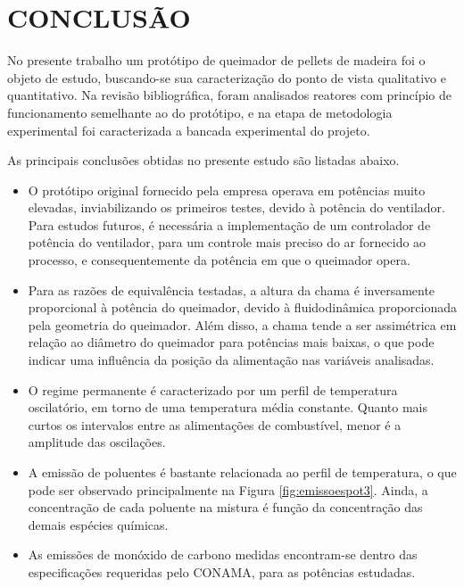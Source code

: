 






\chapter*{CONCLUSÃO}

No presente trabalho um protótipo de queimador de pellets de madeira foi o objeto de estudo, buscando-se sua caracterização do ponto de vista qualitativo e quantitativo. Na revisão bibliográfica, foram analisados reatores com princípio de funcionamento semelhante ao do protótipo, e na etapa de metodologia experimental foi caracterizada a bancada experimental do projeto.

As principais conclusões obtidas no presente estudo são listadas abaixo.

\begin{itemize}
    \item O protótipo original fornecido pela empresa operava em potências muito elevadas, inviabilizando os primeiros testes, devido à potência do ventilador. Para estudos futuros, é necessária a implementação de um controlador de potência do ventilador, para um controle mais preciso do ar fornecido ao processo, e consequentemente da potência em que o queimador opera. 
    \item Para as razões de equivalência testadas, a altura da chama é inversamente proporcional à potência do queimador, devido à fluidodinâmica proporcionada pela geometria do queimador. Além disso, a chama tende a ser assimétrica em relação ao diâmetro do queimador para potências mais baixas, o que pode indicar uma influência da posição da alimentação nas variáveis analisadas.
    \item O regime permanente é caracterizado por um perfil de temperatura oscilatório, em torno de uma temperatura média constante. Quanto mais curtos os intervalos entre as alimentações de combustível, menor é a amplitude das oscilações.
    \item A emissão de poluentes é bastante relacionada ao perfil de temperatura, o que pode ser observado principalmente na Figura \ref{fig:emissoespot3}. Ainda, a concentração de cada poluente na mistura é função da concentração das demais espécies químicas.
    \item As emissões de monóxido de carbono medidas encontram-se dentro das especificações requeridas pelo CONAMA, para as potências estudadas.
\end{itemize}


